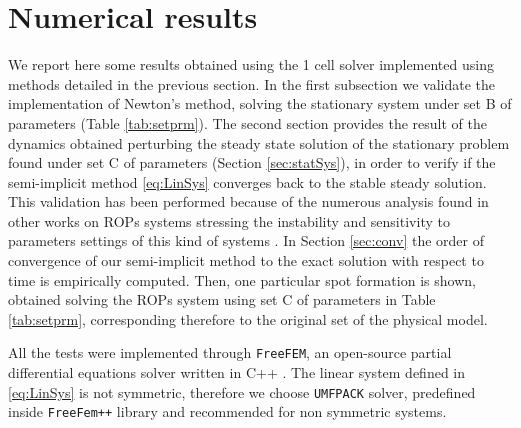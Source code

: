 \section{Numerical results}

We report here some results obtained using the 1 cell solver implemented using methods detailed in the previous section. In the first subsection we validate the implementation of Newton's method, solving the stationary system under set B of parameters (Table \ref{tab:setprm}). The second section provides the result of the dynamics obtained perturbing the steady state solution of the stationary problem found under set C of parameters (Section \ref{sec:statSys}), in order to verify if the semi-implicit method \eqref{eq:LinSys} converges back to the stable steady solution. This validation has been performed because of the numerous analysis found in other works on ROPs systems stressing the instability and sensitivity to parameters settings of this kind of systems \cite{intra2:14, intra2:7}. In Section \ref{sec:conv} the order of convergence of our semi-implicit method to the exact solution with respect to time is empirically computed. Then, one particular spot formation is shown, obtained solving the ROPs system using set C of parameters in Table \ref{tab:setprm}, corresponding therefore to the original set of the physical model.

All the tests were implemented through \verb|FreeFEM|, an open-source partial differential equations solver written in C++ \cite{freefem}. The linear system defined in \eqref{eq:LinSys} is not symmetric, therefore we choose \verb|UMFPACK| solver, predefined inside \verb|FreeFem++| library and recommended for non symmetric systems.



